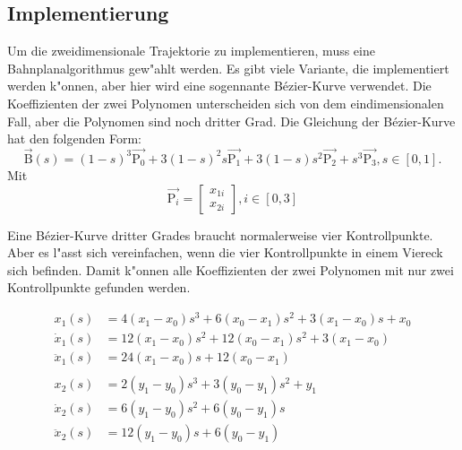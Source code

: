 \subsection{Implementierung}

Um die zweidimensionale Trajektorie zu implementieren, muss eine Bahnplanalgorithmus gew"ahlt werden. Es gibt viele Variante, die implementiert werden k"onnen, aber hier wird eine sogennante B\'ezier-Kurve verwendet. Die Koeffizienten der zwei Polynomen unterscheiden sich von dem eindimensionalen Fall, aber die Polynomen sind noch dritter Grad. Die Gleichung der B\'ezier-Kurve hat den folgenden Form:
\begin{equation*}
    \overrightarrow{\text{B}}(s) = (1 - s)^3\overrightarrow{\text{P}_0} + 3(1 - s)^2s\overrightarrow{\text{P}_1} + 3(1 - s)s^2\overrightarrow{\text{P}_2} + s^3\overrightarrow{\text{P}_3}, s \in [0, 1].
\end{equation*}
Mit
\begin{equation*}
    \overrightarrow{\text{P}_i} =
    \begin{bmatrix*}
        x_{1i} \\
        x_{2i}
    \end{bmatrix*}
    , i \in [0, 3]
\end{equation*}

Eine B\'ezier-Kurve dritter Grades braucht normalerweise vier Kontrollpunkte. Aber es l"asst sich vereinfachen, wenn die vier Kontrollpunkte in einem Viereck sich befinden. Damit k"onnen alle Koeffizienten der zwei Polynomen mit nur zwei Kontrollpunkte gefunden werden. 

\begin{align*}
    x_1(s) &= 4(x_1 - x_0)s^3 + 6(x_0 - x_1)s^2 + 3(x_1 - x_0)s + x_0 \\
    \dot{x}_1(s) &= 12(x_1 - x_0)s^2 + 12(x_0 - x_1)s^2 + 3(x_1 - x_0) \\
    \ddot{x}_1(s) &= 24(x_1 - x_0)s + 12(x_0 - x_1) \\
    \\
    x_2(s) &= 2(y_1 - y_0)s^3 + 3(y_0 - y_1)s^2 + y_1 \\
    \dot{x}_2(s) &= 6(y_1 - y_0)s^2 + 6(y_0 - y_1)s \\
    \ddot{x}_2(s) &= 12(y_1 - y_0)s + 6(y_0 - y_1)
\end{align*}

